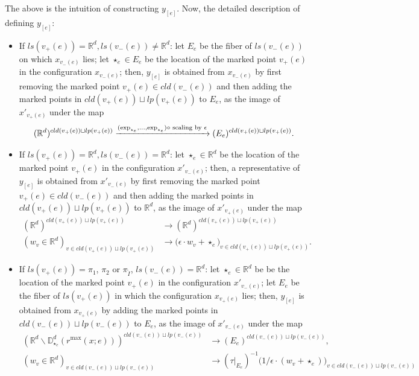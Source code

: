 \documentclass[11pt]{article}
\theoremstyle{definition}
\theoremstyle{remark}
\def\R{\mathbb{R}}
\def\D{\mathbb{D}}
\def\rI{{\mathring{I}}}
\def\tn#1{\textnormal{#1}}
\begin{document}
The above is the intuition of constructing $y_{[e]}$. Now, the detailed description of defining $y_{[e]}$: 

\begin{itemize}
\item If $ls(v_+(e))=\R^d, ls(v_-(e))\neq\R^d$:
let $E_e$ be the fiber of $ls(v_-(e))$ on which $x_{v_-(e)}$ lies;
let $\star_e\in E_e$ be the location of the marked point $v_+(e)$ in the configuration $x_{v_-(e)}$; 
then, 
$y_{[e]}$ is obtained from $x_{v_-(e)}$ by first removing the marked point $v_+(e)\in cld(v_-(e))$ and then adding the marked points in $cld(v_+(e))\sqcup lp(v_+(e))$ to $E_e$, as the image of $x'_{v_+(e)}$ under the map
$$(\R^d)^{cld(v_+(e))\sqcup lp(v_+(e))}\xrightarrow{(\exp_{\star_e},\ldots,\exp_{\star_e})\circ\tn{ scaling by }\epsilon}(E_e)^{cld(v_+(e))\sqcup lp(v_+(e))}.$$
\item If $ls(v_+(e))=\R^d, ls(v_-(e))=\R^d$: let $\star_e\in \R^d$ be the location of the marked point $v_+(e)$ in the configuration $x'_{v_-(e)}$; then, 
a representative of $y_{[e]}$ is obtained from $x'_{v_-(e)}$ by first removing the marked point $v_+(e)\in cld(v_-(e))$ and then adding the marked points in $cld(v_+(e))\sqcup lp(v_+(e))$ to $\R^d$, as the image of $x'_{v_+(e)}$ under the map
\begin{align*}
(\R^d)^{cld(v_+(e))\sqcup lp(v_+(e))}&\longrightarrow(\R^d)^{cld(v_+(e))\sqcup lp(v_+(e))}\\
(w_v\in\R^d)_{v\in cld(v_+(e))\sqcup lp(v_+(e))}&\longrightarrow\big(\epsilon\cdot w_v+\star_e\big)_{v\in cld(v_+(e))\sqcup lp(v_+(e))}.
\end{align*}
\item If $ls(v_+(e))=\pi_1$, $\pi_2$ or $\pi_\rI$, $ls(v_-(e))=\R^d$:  
let $\star_e\in\R^d$ be be the location of the marked point $v_+(e)$ in the configuration $x'_{v_-(e)}$; 
let $E_e$ be the fiber of $ls(v_+(e))$ in which the configuration $x_{v_+(e)}$ lies; then, 
$y_{[e]}$ is obtained from $x_{v_+(e)}$ by adding the marked points in $cld(v_-(e))\sqcup lp(v_-(e))$ to $E_e$, as the image of $x'_{v_-(e)}$ under the map
\begin{align*}
(\R^d\backslash\D^d_{\star_e}(r^{\max}(x;e)))^{cld(v_-(e))\sqcup lp(v_-(e))}&\longrightarrow(E_e)^{cld(v_-(e))\sqcup lp(v_-(e))},\\
(w_v\in\R^d)_{v\in cld(v_-(e))\sqcup lp(v_-(e))}&\to (\tau|_{E_e})^{-1}\big(1/\epsilon\cdot(w_v+\star_e)\big)_{v\in cld(v_-(e))\sqcup lp(v_-(e))}

\end{align*}
\end{itemize}
\end{document}
